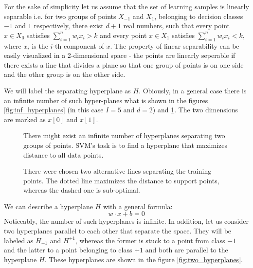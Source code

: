 For the sake of simplicity let us assume that the set of learning samples is linearly separable i.e. for two groups of points $X_{-1}$ and $X_1$, belonging to decision classes $-1$ and $1$ respectively, there exist $d+1$ real numbers, such that every point $x \in X_{0}$ satisfies $\sum^{n}_{i=1}w_ix_i > k$ and every point $x \in X_{1}$ satisfies $\sum^{n}_{i=1}w_ix_i < k$, where $x_i$ is the $i$-th component of $x$. The property of linear separability can be easily visualized in a 2-dimensional space - the points are linearly seperable if there exists a line that divides a plane so that one group of points is on one side and the other group is on the other side.

 We will label the separating hyperplane as $H$. Obiously, in a general case there is an infinite number of such hyper-planes what is shown in the figures \ref{fig:inf_hyperplanes} (in this case $I=5$ and $d=2$) and \ref{fig:optimal_and_suboptimal}. The two dimensions are marked as $x[0]$ and $x[1]$.

\begin{figure}[t!]
\centering
\begin{minipage}[t!]{0.45\linewidth}
  
  \caption{There might exist an infinite number of hyperplanes separating two groups of points. SVM's task is to find a hyperplane that maximizes distance to all data points.}
  \label{fig:inf_hyperplanes}
\end{minipage}
\quad
\begin{minipage}[t!]{0.45\linewidth}
  
  \caption{There were chosen two alternative lines separating the training points. The dotted line maximizes the distance to support points, whereas the dashed one is sub-optimal.}
  \label{fig:optimal_and_suboptimal}
\end{minipage}
\end{figure}

We can describe a hyperplane $H$ with a general formula:
\begin{equation}
w \cdot x+b = 0
\end{equation}
Noticeably, the number of such hyperplanes is infinite. In addition, let us consider two hyperplanes parallel to each other that separate the space. They will be labeled as $H_{-1}$ and $H^{+1}$, whereas the former is stuck to a point from class $-1$ and the latter to a point belonging to class $+1$ and both are parallel to the hyperplane $H$. These hyperplanes are shown in the figure \ref{fig:two_hyperplanes}.

